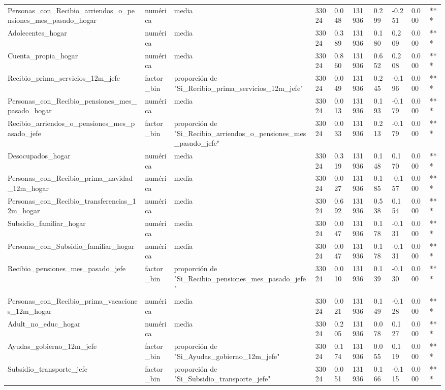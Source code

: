 \begin{longtable}[t]{llllllllll}
Personas\_con\_Recibio\_arriendos\_o\_pensiones\_mes\_pasado\_hogar & numérica & media & 33024 & 0.048 & 131936 & 0.299 & -0.251 & 0.000 & ***\\
Adolecentes\_hogar & numérica & media & 33024 & 0.389 & 131936 & 0.180 & 0.209 & 0.000 & ***\\
Cuenta\_propia\_hogar & numérica & media & 33024 & 0.860 & 131936 & 0.652 & 0.208 & 0.000 & ***\\
Recibio\_prima\_servicios\_12m\_jefe & factor\_bin & proporción de "Si\_Recibio\_prima\_servicios\_12m\_jefe" & 33024 & 0.049 & 131936 & 0.245 & -0.196 & 0.000 & ***\\
Personas\_con\_Recibio\_pensiones\_mes\_pasado\_hogar & numérica & media & 33024 & 0.013 & 131936 & 0.193 & -0.179 & 0.000 & ***\\
Recibio\_arriendos\_o\_pensiones\_mes\_pasado\_jefe & factor\_bin & proporción de "Si\_Recibio\_arriendos\_o\_pensiones\_mes\_pasado\_jefe" & 33024 & 0.033 & 131936 & 0.213 & -0.179 & 0.000 & ***\\
Desocupados\_hogar & numérica & media & 33024 & 0.319 & 131936 & 0.148 & 0.170 & 0.000 & ***\\
Personas\_con\_Recibio\_prima\_navidad\_12m\_hogar & numérica & media & 33024 & 0.027 & 131936 & 0.185 & -0.157 & 0.000 & ***\\
Personas\_con\_Recibio\_transferencias\_12m\_hogar & numérica & media & 33024 & 0.692 & 131936 & 0.538 & 0.154 & 0.000 & ***\\
Subsidio\_familiar\_hogar & numérica & media & 33024 & 0.047 & 131936 & 0.178 & -0.131 & 0.000 & ***\\
Personas\_con\_Subsidio\_familiar\_hogar & numérica & media & 33024 & 0.047 & 131936 & 0.178 & -0.131 & 0.000 & ***\\
Recibio\_pensiones\_mes\_pasado\_jefe & factor\_bin & proporción de "Si\_Recibio\_pensiones\_mes\_pasado\_jefe" & 33024 & 0.010 & 131936 & 0.139 & -0.130 & 0.000 & ***\\
Personas\_con\_Recibio\_prima\_vacaciones\_12m\_hogar & numérica & media & 33024 & 0.021 & 131936 & 0.149 & -0.128 & 0.000 & ***\\
Adult\_no\_educ\_hogar & numérica & media & 33024 & 0.205 & 131936 & 0.078 & 0.127 & 0.000 & ***\\
Ayudas\_gobierno\_12m\_jefe & factor\_bin & proporción de "Si\_Ayudas\_gobierno\_12m\_jefe" & 33024 & 0.174 & 131936 & 0.055 & 0.119 & 0.000 & ***\\
Subsidio\_transporte\_jefe & factor\_bin & proporción de "Si\_Subsidio\_transporte\_jefe" & 33024 & 0.051 & 131936 & 0.166 & -0.115 & 0.000 & ***\\

\end{longtable}
